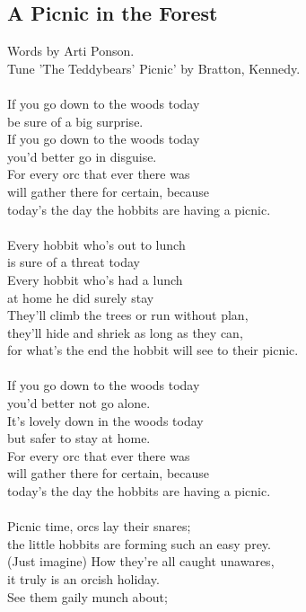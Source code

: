 \begin{multicols}{2}
\section{A Picnic in the Forest}
Words by Arti Ponson.
\\
Tune ’The Teddybears’ Picnic’ by Bratton, Kennedy.
\\
\\
If you go down to the woods today
\\
be sure of a big surprise.
\\
If you go down to the woods today
\\
you’d better go in disguise.
\\
For every orc that ever there was
\\
will gather there for certain, because
\\
today’s the day the hobbits are having a picnic.
\\
\\
Every hobbit who’s out to lunch
\\
is sure of a threat today
\\
Every hobbit who’s had a lunch
\\
at home he did surely stay
\\
They’ll climb the trees or run without plan,
\\
they’ll hide and shriek as long as they can,
\\
for what’s the end the hobbit will see to their picnic.
\\
\\
If you go down to the woods today
\\
you’d better not go alone.
\\
It’s lovely down in the woods today
\\
but safer to stay at home.
\\
For every orc that ever there was
\\
will gather there for certain, because
\\
today’s the day the hobbits are having a picnic.
\\
\\
Picnic time, orcs lay their snares;
\\
the little hobbits are forming such an easy prey.
\\
(Just imagine) How they’re all caught unawares,
\\
it truly is an orcish holiday.
\\
See them gaily munch about;

\end{multicols}
